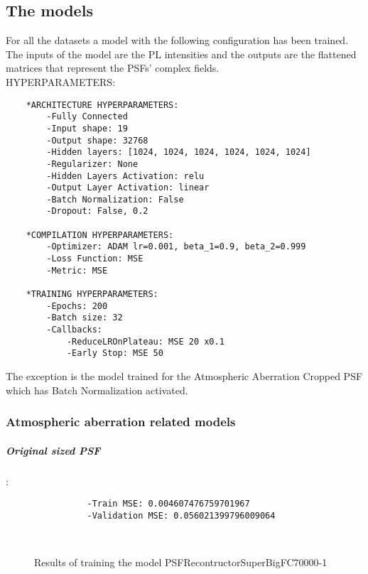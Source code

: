 \subsection{The models}

	For all the datasets a model with the following configuration has been trained. The inputs of the model are the PL intensities and the outputs are the flattened matrices that represent the PSFs' complex fields.\\
	
	{\normalsize HYPERPARAMETERS:}
	\begin{lstlisting}
	*ARCHITECTURE HYPERPARAMETERS:
		-Fully Connected
		-Input shape: 19
		-Output shape: 32768
		-Hidden layers: [1024, 1024, 1024, 1024, 1024, 1024]
		-Regularizer: None
		-Hidden Layers Activation: relu
		-Output Layer Activation: linear
		-Batch Normalization: False
		-Dropout: False, 0.2
	
	*COMPILATION HYPERPARAMETERS:
		-Optimizer: ADAM lr=0.001, beta_1=0.9, beta_2=0.999
		-Loss Function: MSE
		-Metric: MSE
	
	*TRAINING HYPERPARAMETERS:
		-Epochs: 200
		-Batch size: 32
		-Callbacks: 
			-ReduceLROnPlateau: MSE 20 x0.1
			-Early Stop: MSE 50
	\end{lstlisting}
	
	The exception is the model trained for the Atmospheric Aberration Cropped PSF which has Batch Normalization activated.
	
	\subsubsection{Atmospheric aberration related models}
	
		\subparagraph{Original sized PSF}:\\
		\begin{lstlisting}	
        		-Train MSE: 0.004607476759701967
        		-Validation MSE: 0.056021399796009064
		\end{lstlisting}
		
		\begin{figure*}[ht!]
			\hspace{\fill}
			\hspace{\fill}
			\\
			\caption{Results of training the model PSFRecontructorSuperBigFC70000-1}
		\end{figure*}
		
